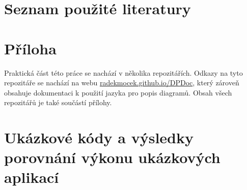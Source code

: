 \documentclass[FM,DP]{tulthesis}
\begin{document}
	\chapter*{Seznam použité literatury}
	\printbibliography[heading=none]
	
	\appendix
	\chapter{Příloha}
	
	Praktická část této práce se nachází v několika repozitářích. Odkazy na tyto repozitáře se nachází na webu \href{https://radekmocek.github.io/DPDoc}{radekmocek.github.io/DPDoc}, který zároveň obsahuje dokumentaci k použití jazyka pro popis diagramů. Obsah všech repozitářů je také součástí přílohy.
	
	{\let\clearpage\relax \chapter{Ukázkové kódy a výsledky porovnání výkonu ukázkových aplikací}}\vspace{-1.085cm}
	
	\begin{code}[H]
		
		\caption{Kód demonstrující přístup IMGUI v knihovně Dear ImGui}
		\label{_tag_code_HelloCounterImGui}
	\end{code}	

	\begin{code}[H]
		\vspace{2cm}
		
		\caption{Kód demonstrující přístup RMGUI v knihovně Qt}
		\label{_tag_code_HelloCounterQt}
	\end{code}	
	
	\begin{code}[H]
		\vspace{1cm}
		
		\caption{Porovnání knihoven: celočíselné vstupní pole}
		\label{_tag_code_NumericUpDown}
	\end{code}
	
	\begin{code}[H]
		\vspace{2cm}
		
		\caption{Dear ImGui a Qt: záložka \textit{Zobrazení} v okně s nastavením}
		\label{_tag_code_settings}
	\end{code}
	
\end{document}

